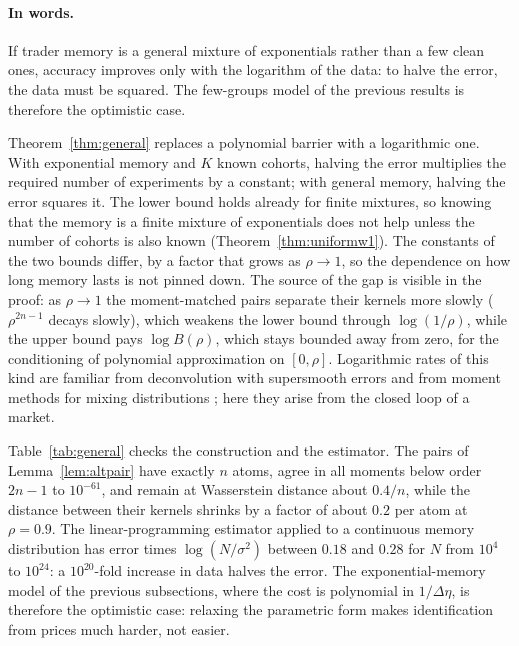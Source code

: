 \documentclass[12pt]{article}
\theoremstyle{definition}
\theoremstyle{remark}
\begin{document}
\paragraph{In words.} If trader memory is a general mixture of exponentials rather than a few clean ones, accuracy improves only with the logarithm of the data: to halve the error, the data must be squared. The few-groups model of the previous results is therefore the optimistic case.


Theorem~\ref{thm:general} replaces a polynomial barrier with a logarithmic one. With exponential memory and $K$ known cohorts, halving the error multiplies the required number of experiments by a constant; with general memory, halving the error squares it. The lower bound holds already for finite mixtures, so knowing that the memory is a finite mixture of exponentials does not help unless the number of cohorts is also known (Theorem~\ref{thm:uniformw1}). The constants of the two bounds differ, by a factor that grows as $\rho\to1$, so the dependence on how long memory lasts is not pinned down. The source of the gap is visible in the proof: as $\rho\to1$ the moment-matched pairs separate their kernels more slowly ($\rho^{2n-1}$ decays slowly), which weakens the lower bound through $\log(1/\rho)$, while the upper bound pays $\log B(\rho)$, which stays bounded away from zero, for the conditioning of polynomial approximation on $[0,\rho]$. Logarithmic rates of this kind are familiar from deconvolution with supersmooth errors \citep{fan1991} and from moment methods for mixing distributions \citep{kong2017,wu2020}; here they arise from the closed loop of a market.

Table~\ref{tab:general} checks the construction and the estimator. The pairs of Lemma~\ref{lem:altpair} have exactly $n$ atoms, agree in all moments below order $2n-1$ to $10^{-61}$, and remain at Wasserstein distance about $0.4/n$, while the distance between their kernels shrinks by a factor of about $0.2$ per atom at $\rho=0.9$. The linear-programming estimator applied to a continuous memory distribution has error times $\log(N/\sigma^2)$ between $0.18$ and $0.28$ for $N$ from $10^4$ to $10^{24}$: a $10^{20}$-fold increase in data halves the error. The exponential-memory model of the previous subsections, where the cost is polynomial in $1/\Delta\eta$, is therefore the optimistic case: relaxing the parametric form makes identification from prices much harder, not easier.
\end{document}
